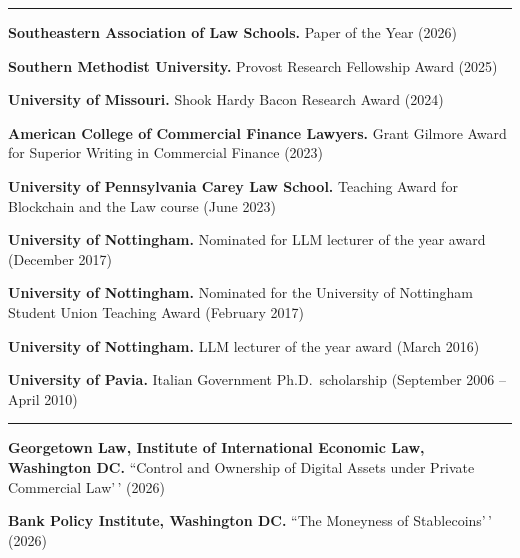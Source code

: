 \documentclass[
  11pt,
  letterpaper]{article}
\begin{document}
\vspace{0.25em}\hrule\vspace{0.7em}

\noindent\textbf{Southeastern Association of Law Schools.} Paper of the
Year (2026)

\vspace{0.8em}\noindent\textbf{Southern Methodist University.} Provost
Research Fellowship Award (2025)

\vspace{0.8em}\noindent\textbf{University of Missouri.} Shook Hardy
Bacon Research Award (2024)

\vspace{0.8em}\noindent\textbf{American College of Commercial Finance Lawyers.}
Grant Gilmore Award for Superior Writing in Commercial Finance (2023)

\vspace{0.8em}\noindent\textbf{University of Pennsylvania Carey Law School.}
Teaching Award for Blockchain and the Law course (June 2023)

\vspace{0.8em}\noindent\textbf{University of Nottingham.} Nominated for
LLM lecturer of the year award (December 2017)

\vspace{0.8em}\noindent\textbf{University of Nottingham.} Nominated for
the University of Nottingham Student Union Teaching Award (February
2017)

\vspace{0.8em}\noindent\textbf{University of Nottingham.} LLM lecturer
of the year award (March 2016)

\vspace{0.8em}\noindent\textbf{University of Pavia.} Italian Government
Ph.D.~scholarship (September 2006 -- April 2010)

\vspace{0.25em}\hrule\vspace{0.7em}

\noindent\textbf{Georgetown Law, Institute of International Economic Law, Washington DC.}
``Control and Ownership of Digital Assets under Private Commercial
Law'\,' (2026)

\vspace{0.8em}\noindent\textbf{Bank Policy Institute, Washington DC.}
``The Moneyness of Stablecoins'\,' (2026)
\end{document}
